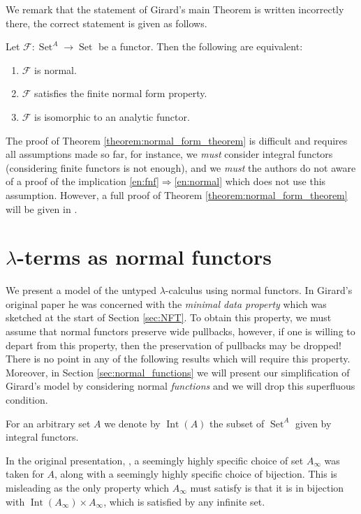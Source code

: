 \documentclass[runningheads]{llncs}
\newcommand{\scr}[1]{\mathscr{#1}}
\newcommand{\lto}{\longrightarrow}
\DeclareMathOperator{\set}{Set}
\begin{document}
We remark that the statement of Girard's main Theorem is written incorrectly there, the correct statement is given as follows.
 
\begin{theorem}\label{theorem:normal_form_theorem}
    Let $\scr{F}: \set^A \lto \set$ be a functor. Then the following are equivalent:
    \begin{enumerate}
        \item\label{en:normal} $\scr{F}$ is normal.
        \item\label{en:fnf} $\scr{F}$ satisfies the finite normal form property.
        \item $\scr{F}$ is isomorphic to an analytic functor.
    \end{enumerate}
\end{theorem}
The proof of Theorem \ref{theorem:normal_form_theorem} is difficult and requires all assumptions made so far, for instance, we \textit{must} consider integral functors (considering finite functors is not enough), and we \textit{must} the authors do not aware of a proof of the implication \ref{en:fnf}$\Rightarrow$\ref{en:normal} which does not use this assumption. However, a full proof of Theorem \ref{theorem:normal_form_theorem} will be given in \cite{PhD}.

\section{$\lambda$-terms as normal functors}
We present a model of the untyped $\lambda$-calculus using normal functors. In Girard's original paper he was concerned with the \textit{minimal data property} which was sketched at the start of Section \ref{sec:NFT}. To obtain this property, we must assume that normal functors preserve wide pullbacks, however, if one is willing to depart from this property, then the preservation of pullbacks may be dropped! There is no point in any of the following results which will require this property. Moreover, in Section \ref{sec:normal_functions} we will present our simplification of Girard's model by considering normal \textit{functions} and we will drop this superfluous condition.
\begin{definition}
    For an arbitrary set $A$ we denote by $\operatorname{Int}(A)$ the subset of $\set^A$ given by integral functors.
\end{definition}

\begin{remark}
    In the original presentation, \cite[Proposition 3.1]{Girard}, a seemingly highly specific choice of set $A_\infty$ was taken for $A$, along with a seemingly highly specific choice of bijection. This is misleading as the only property which $A_\infty$ must satisfy is that it is in bijection with $\operatorname{Int}(A_\infty) \times A_\infty$, which is satisfied by any infinite set.
\end{remark}
\end{document}
